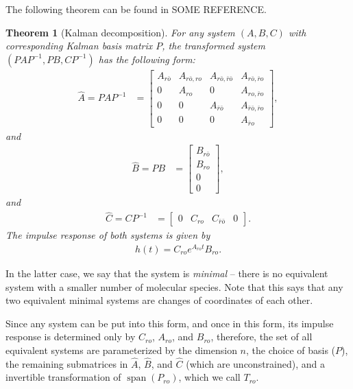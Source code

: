 \documentclass{article}
\newcommand{\ro}{{ro}}
\newcommand{\nro}{{\bar{r}o}}
\newcommand{\rno}{{r\bar{o}}}
\newcommand{\nrno}{{\bar{r}\bar{o}}}
\newcommand{\1}{\mathbbm{1}}
\DeclareMathOperator{\spn}{span}
\newtheorem{theorem}{Theorem}
\begin{document}
The following theorem can be found in SOME REFERENCE.

\begin{theorem}[Kalman decomposition] \label{thm:kalman}
        For any system $(A,B,C)$ with corresponding Kalman basis matrix $P$,
        the transformed system $(PAP^{-1},PB,CP^{-1})$  has the following form:
        \begin{align*}
            \widehat A = PAP^{-1}
            &=
            \left[ \begin{array}{cccc}
                A_{\rno} & A_{\rno,\ro} & A_{\rno,\nrno} & A_{\rno,\nro} \\
                0 & A_{\ro} & 0 & A_{\ro,\nro} \\
                0 & 0 & A_{\nrno} & A_{\nrno,\nro} \\
                0 & 0 & 0 & A_{\nro}
            \end{array} \right] ,
        \end{align*}
        and
        \begin{align*}
            \widehat B = PB
            &=
            \left[ \begin{array}{cccc}
                B_{\rno} \\
                B_{\ro} \\
                0 \\
                0 
            \end{array} \right] ,
        \end{align*}
        and
        \begin{align*}
            \widehat C = CP^{-1}
            &=
            \left[ \begin{array}{cccc}
                0 & C_{\ro} & C_{\nrno} & 0 
            \end{array} \right] .
        \end{align*}
        The impulse response of both systems is given by
        \begin{align*}
          h(t) = C_{\ro} e^{A_{\ro} t} B_{\ro} .
        \end{align*}
\end{theorem}

In the latter case, we say that the system is \emph{minimal} 
-- there is no equivalent system with a smaller number of molecular species.
Note that this says that any two equivalent minimal systems
are changes of coordinates of each other.

Since any system can be put into this form,
and once in this form, its impulse response is determined only by 
$C_{\ro}$, $A_{\ro}$, and $B_\ro$,
therefore, the set of all equivalent systems are parameterized by
the dimension $n$,
the choice of basis ($P$),
the remaining submatrices in $\widehat A$, $\widehat B$, and $\widehat C$
(which are unconstrained),
and a invertible transformation of $\spn(P_{\ro})$, which we call $T_\ro$.
\end{document}
